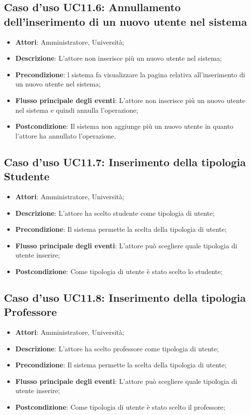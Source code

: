 \subsection{Caso d'uso \texorpdfstring{UC11.6}{UC11.6}: Annullamento dell'inserimento di un nuovo utente nel sistema}
\begin{itemize}
\item \textbf{Attori}: Amministratore, Università;
\item \textbf{Descrizione}: L'attore non inserisce più un nuovo utente nel sistema;
\item \textbf{Precondizione}: l sistema fa visualizzare la pagina relativa all'inserimento di un nuovo utente nel sistema;

\item \textbf{Flusso principale degli eventi}: L'attore non inserisce più un nuovo utente nel sistema e quindi annulla l'operazione;
\item \textbf{Postcondizione}: Il sistema non aggiunge più un nuovo utente in quanto l'attore ha annullato l'operazione.

\end{itemize}
\subsection{Caso d'uso \texorpdfstring{UC11.7}{UC11.7}: Inserimento della tipologia Studente}
\begin{itemize}
\item \textbf{Attori}: Amministratore, Università;
\item \textbf{Descrizione}: L'attore ha scelto studente come tipologia di utente; 
\item \textbf{Precondizione}: Il sistema permette la scelta della tipologia di utente;
\item \textbf{Flusso principale degli eventi}: L'attore può scegliere quale tipologia di utente inserire;
\item \textbf{Postcondizione}: Come tipologia di utente è stato scelto lo studente;
\end{itemize}
\subsection{Caso d'uso \texorpdfstring{UC11.8}{UC11.8}: Inserimento della tipologia Professore}
\begin{itemize}
\item \textbf{Attori}: Amministratore, Università;
\item \textbf{Descrizione}: L'attore ha scelto professore come tipologia di utente; 
\item \textbf{Precondizione}: Il sistema permette la scelta della tipologia di utente;
\item \textbf{Flusso principale degli eventi}: L'attore può scegliere quale tipologia di utente inserire;
\item \textbf{Postcondizione}: Come tipologia di utente è stato scelto il professore;
\end{itemize}
